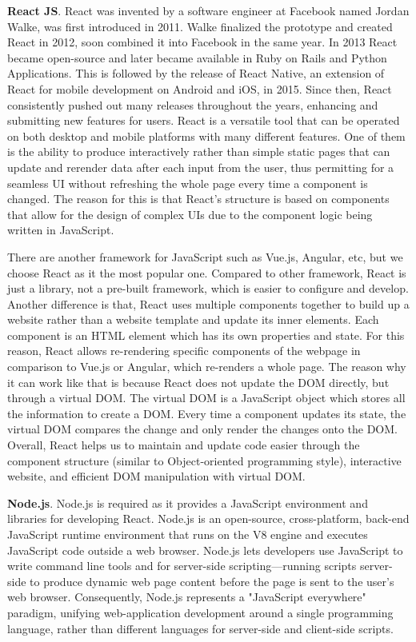 \bigskip
{\textbf{React JS}}. React was invented by a software engineer at Facebook named Jordan Walke, was first introduced in 2011. Walke finalized the prototype and created React in 2012, soon combined it into Facebook in the same year. In 2013 React became open-source and later became available in Ruby on Rails and Python Applications. This is followed by the release of React Native, an extension of React for mobile development on Android and iOS, in 2015. Since then, React consistently pushed out many releases throughout the years, enhancing and submitting new features for users. React is a versatile tool that can be operated on both desktop and mobile platforms with many different features. One of them is the ability to produce interactively rather than simple static pages that can update and rerender data after each input from the user, thus permitting for a seamless UI without refreshing the whole page every time a component is changed. The reason for this is that React’s structure is based on components that allow for the design of complex UIs due to the component logic being written in JavaScript.

There are another framework for JavaScript such as Vue.js, Angular, etc, but we choose React as it the most popular one. Compared to other framework, React is just a library, not a pre-built framework, which is easier to configure and develop. Another difference is that, React uses multiple components together to build up a website rather than a website template and update its inner elements. Each component is an HTML element which has its own properties and state. For this reason, React allows re-rendering specific components of the webpage in comparison to Vue.js or Angular, which re-renders a whole page. The reason why it can work like that is because React does not update the DOM directly, but through a virtual DOM. The virtual DOM is a JavaScript object which stores all the information to create a DOM. Every time a component updates its state, the virtual DOM compares the change and only render the changes onto the DOM. Overall, React helps us to maintain and update code easier through the component structure (similar to Object-oriented programming style), interactive website, and efficient DOM manipulation with virtual DOM.

\bigskip
{\textbf{Node.js}}. Node.js is required as it provides a JavaScript environment and libraries for developing React. Node.js is an open-source, cross-platform, back-end JavaScript runtime environment that runs on the V8 engine and executes JavaScript code outside a web browser. Node.js lets developers use JavaScript to write command line tools and for server-side scripting—running scripts server-side to produce dynamic web page content before the page is sent to the user's web browser. Consequently, Node.js represents a "JavaScript everywhere" paradigm, unifying web-application development around a single programming language, rather than different languages for server-side and client-side scripts.

